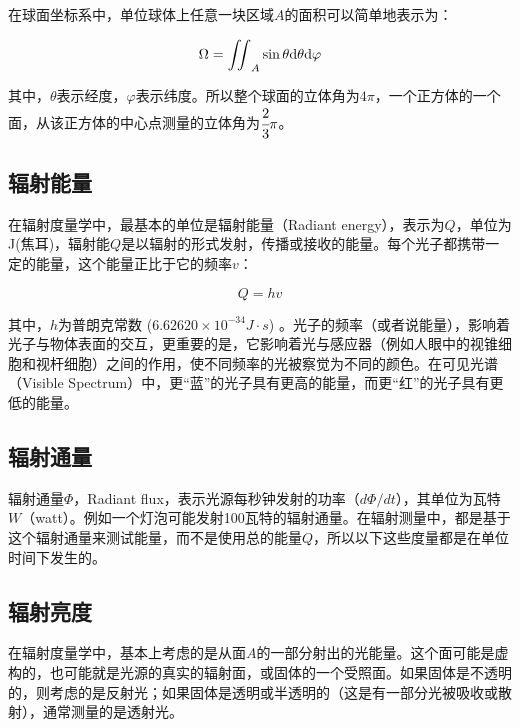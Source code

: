在球面坐标系中，单位球体上任意一块区域$A$的面积可以简单地表示为：

\begin{equation}
	\Omega= {\rm \iint}_A \sin\theta {\rm d}\theta {\rm d}\varphi
\end{equation}

\noindent 其中，$\theta$表示经度，$\varphi$表示纬度。所以整个球面的立体角为$4\pi$，一个正方体的一个面，从该正方体的中心点测量的立体角为$ \cfrac{2}{3}\pi$。





\subsection{辐射能量} 
在辐射度量学中，最基本的单位是辐射能量（Radiant energy），表示为$Q$，单位为J(焦耳)，辐射能$Q$是以辐射的形式发射，传播或接收的能量。每个光子都携带一定的能量，这个能量正比于它的频率$v$：

\begin{equation}
	Q=hv
\end{equation}

\noindent 其中，$h$为普朗克常数 ($6.62620\times 10^{-34} J\cdot s$) 。光子的频率（或者说能量），影响着光子与物体表面的交互，更重要的是，它影响着光与感应器（例如人眼中的视锥细胞和视杆细胞）之间的作用，使不同频率的光被察觉为不同的颜色。在可见光谱（Visible Spectrum）中，更“蓝”的光子具有更高的能量，而更“红”的光子具有更低的能量。 



\subsection{辐射通量} 
辐射通量$\Phi$，Radiant flux，表示光源每秒钟发射的功率（$d\Phi/dt$），其单位为瓦特$W$（watt）。例如一个灯泡可能发射100瓦特的辐射通量。在辐射测量中，都是基于这个辐射通量来测试能量，而不是使用总的能量$Q$，所以以下这些度量都是在单位时间下发生的。





\subsection{辐射亮度} 
在辐射度量学中，基本上考虑的是从面$A$的一部分射出的光能量。这个面可能是虚构的，也可能就是光源的真实的辐射面，或固体的一个受照面。如果固体是不透明的，则考虑的是反射光；如果固体是透明或半透明的（这是有一部分光被吸收或散射），通常测量的是透射光。

